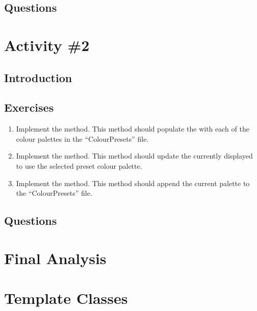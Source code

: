     \subsection{Questions}
      
  \pagebreak

  \section{Activity \#2} %
    \subsection{Introduction}
    \subsection{Exercises}
      \begin{enumerate}
        \item Implement the  method. This method should populate the   with each of the colour palettes in the ``ColourPresets'' file.
        \item Implement the  method. This method should update the currently displayed  to use the selected preset colour palette.
        \item Implement the  method. This method should append the current palette to the ``ColourPresets'' file.
      \end{enumerate}
    \subsection{Questions}

  \pagebreak

  \section{Final Analysis}

  \pagebreak

  \section{Template Classes}
